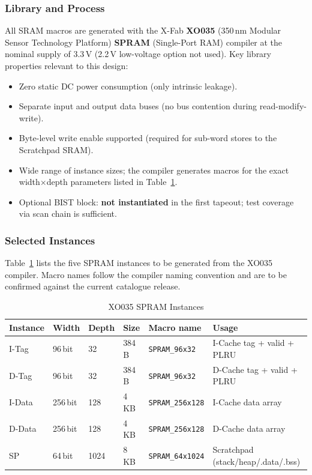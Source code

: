 \subsubsection{Library and Process}

All SRAM macros are generated with the X-Fab \textbf{XO035}
(350\,nm Modular Sensor Technology Platform)
\textbf{SPRAM} (Single-Port RAM) compiler at the nominal supply of
3.3\,V (2.2\,V low-voltage option not used).
Key library properties relevant to this design:

\begin{itemize}
  \item Zero static DC power consumption (only intrinsic leakage).
  \item Separate input and output data buses (no bus contention during
    read-modify-write).
  \item Byte-level write enable supported (required for sub-word stores
    to the Scratchpad SRAM).
  \item Wide range of instance sizes; the compiler generates macros for
    the exact width$\times$depth parameters listed in
    Table~\ref{tab:asSramInstances}.
  \item Optional BIST block: \textbf{not instantiated} in the first
    tapeout; test coverage via scan chain is sufficient.
\end{itemize}

\subsubsection{Selected Instances}

Table~\ref{tab:asSramInstances} lists the five SPRAM instances to be
generated from the XO035 compiler.
Macro names follow the compiler naming convention and are to be confirmed
against the current catalogue release.

\begin{table}[H]
\caption{XO035 SPRAM Instances}
\label{tab:asSramInstances}
\centering
\begin{tabularx}{\textwidth}{|l |l |l |l |l |X|}
  \hline
  Instance & Width & Depth & Size & Macro name & Usage \\
  \hline
  \hline
  I-Tag  & 96\,bit  & 32   & 384\,B & \texttt{SPRAM\_96x32}   & I-Cache tag + valid + PLRU \\
  \hline
  D-Tag  & 96\,bit  & 32   & 384\,B & \texttt{SPRAM\_96x32}   & D-Cache tag + valid + PLRU \\
  \hline
  I-Data & 256\,bit & 128  & 4\,KB  & \texttt{SPRAM\_256x128} & I-Cache data array \\
  \hline
  D-Data & 256\,bit & 128  & 4\,KB  & \texttt{SPRAM\_256x128} & D-Cache data array \\
  \hline
  SP     & 64\,bit  & 1024 & 8\,KB  & \texttt{SPRAM\_64x1024} & Scratchpad (stack/heap/.data/.bss) \\
  \hline
\end{tabularx}
\end{table}

